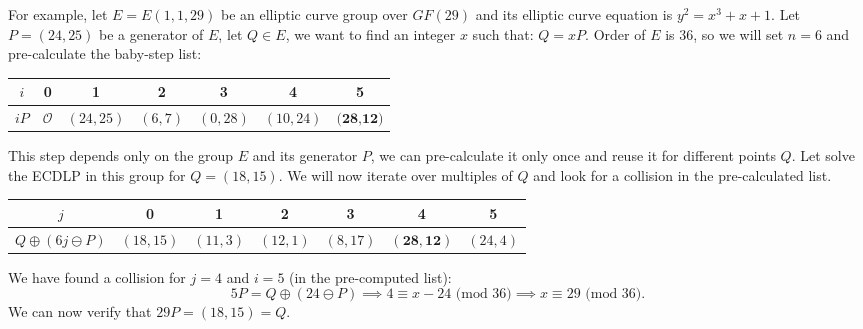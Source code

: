 \documentclass[thesis=M,english]{FITthesis}[2012/10/20]
\theoremstyle{remark}
\theoremstyle{definition}
\begin{document}
\noindent For example, let $E = E(1,1,29)$ be an elliptic curve group over $GF(29)$ and its elliptic curve equation is $y^2 = x^3 + x + 1$. Let $P = (24,25)$ be a generator of $E$, let $Q \in E$, we want to find an integer $x$ such that: $Q = xP.$ Order of $E$ is 36, so we will set $n = 6$ and pre-calculate the baby-step list:
\begin{center}
\begin{tabular}{ |c||c|c|c|c|c|c| }
\hline
$i$ & 0 & 1 & 2 & 3 & 4 & 5\\ \hline
 $iP$ & $\mathcal{O}$ & $(24,25)$ &  $(6,7)$ & $(0,28)$ & $(10,24)$ & $\textbf{(28,12)}$ \\ \hline
\end{tabular}
\end{center}
This step depends only on the group $E$ and its generator $P$, we can pre-calculate it only once and reuse it for different points $Q$. Let solve the ECDLP in this group for $Q = (18,15)$. We will now iterate over multiples of $Q$ and look for a collision in the pre-calculated list.
\begin{center}
\begin{tabular}{ |c||c|c|c|c|c|c| }
\hline
$j$ & 0 & 1 & 2 & 3 & 4 & 5\\ \hline
 $Q\oplus(6j\ominus P)$ & $(18,15)$ & $(11,3)$ &  $(12,1)$ & $(8,17)$ & $\mathbf{(28,12)}$ & $(24,4)$ \\ \hline
\end{tabular}
\end{center}
We have found a collision for $j=4$ and $i=5$ (in the pre-computed list):
$$
5P = Q\oplus(24\ominus P) \implies 4 \equiv x -24 \text{ (mod 36)} \implies x \equiv 29  \text{ (mod 36)}.
$$
We can now verify that $29P = (18,15) = Q.$
\end{document}
